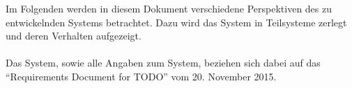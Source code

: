 Im Folgenden werden in diesem Dokument verschiedene Perspektiven des zu entwickelnden Systems betrachtet. Dazu wird das System in Teilsysteme zerlegt und deren Verhalten aufgezeigt.\\
\\
Das System, sowie alle Angaben zum System, beziehen sich dabei auf das "`Requirements Document for TODO"' vom 20. November 2015.